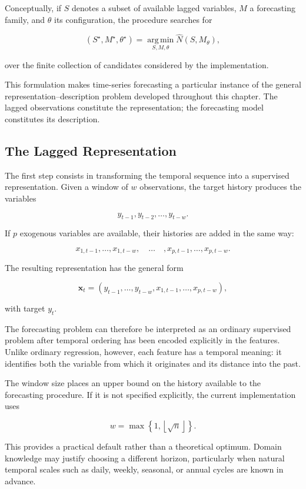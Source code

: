 Conceptually, if \(S\) denotes a subset of available lagged variables,
\(M\) a forecasting family, and \(\theta\) its configuration, the procedure
searches for

\[
(S^\star,M^\star,\theta^\star)
=
\operatorname*{arg\,min}_{S,M,\theta}
\widehat N(S,M_\theta),
\]

over the finite collection of candidates considered by the implementation.

This formulation makes time-series forecasting a particular instance of the
general representation--description problem developed throughout this chapter.
The lagged observations constitute the representation; the forecasting model
constitutes its description.

\subsection*{The Lagged Representation}

The first step consists in transforming the temporal sequence into a supervised
representation. Given a window of \(w\) observations, the target history produces
the variables

\[
y_{t-1},y_{t-2},\ldots,y_{t-w}.
\]

If \(p\) exogenous variables are available, their histories are added in the same
way:

\[
x_{1,t-1},\ldots,x_{1,t-w},
\quad\ldots\quad,
x_{p,t-1},\ldots,x_{p,t-w}.
\]

The resulting representation has the general form

\[
\mathbf{x}_t
=
\left(
y_{t-1},\ldots,y_{t-w},
x_{1,t-1},\ldots,x_{p,t-w}
\right),
\]

with target \(y_t\).

The forecasting problem can therefore be interpreted as an ordinary supervised
problem after temporal ordering has been encoded explicitly in the features.
Unlike ordinary regression, however, each feature has a temporal meaning: it
identifies both the variable from which it originates and its distance into the
past.

The window size places an upper bound on the history available to the
forecasting procedure. If it is not specified explicitly, the current
implementation uses

\[
w
=
\max
\left\{
1,
\left\lfloor\sqrt{n}\right\rfloor
\right\}.
\]

This provides a practical default rather than a theoretical optimum. Domain
knowledge may justify choosing a different horizon, particularly when natural
temporal scales such as daily, weekly, seasonal, or annual cycles are known in
advance.


